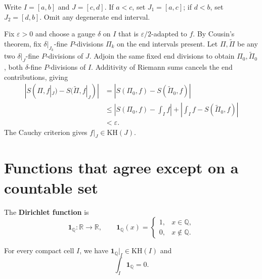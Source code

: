 \begin{proofenv}
Write $I=[a,b]$ and $J=[c,d]$. If $a<c$, set $J_1=[a,c]$;
if $d<b$, set $J_2=[d,b]$. Omit any degenerate end interval.

Fix $\varepsilon>0$ and choose a gauge $\delta$ on $I$ that is
$\varepsilon/2$-adapted to $f$. By Cousin's theorem, fix
$\delta|_{J_k}$-fine $P$-divisions $\Pi_k$ on the end intervals present.
Let $\Pi,\widetilde\Pi$ be any two $\delta|_J$-fine $P$-divisions of $J$.
Adjoin the same fixed end divisions to obtain $\Pi_0,\widetilde\Pi_0$,
both $\delta$-fine $P$-divisions of $I$.
Additivity of Riemann sums cancels the end contributions, giving
\[
\begin{aligned}
    |S(\Pi,f|_J)-S(\widetilde\Pi,f|_J)|
    &=|S(\Pi_0,f)-S(\widetilde\Pi_0,f)|\\
    &\le\left|S(\Pi_0,f)-\int_I f\right|
       +\left|\int_I f-S(\widetilde\Pi_0,f)\right|\\
    &<\varepsilon.
\end{aligned}
\]
The Cauchy criterion gives $f|_J\in\mathrm{KH}(J)$.
\end{proofenv}


\section{Functions that agree except on a countable set}

\begin{definitionenv}
The \textbf{Dirichlet function} is
\[
    \mathbf1_{\mathbb Q}:\mathbb R\to\mathbb R,\qquad
    \mathbf1_{\mathbb Q}(x)=
    \begin{cases}
        1,&x\in\mathbb Q,\\
        0,&x\notin\mathbb Q.
    \end{cases}
\]
\end{definitionenv}

\begin{propositionenv}
For every compact cell $I$, we have
$\mathbf1_{\mathbb Q}|_I\in\mathrm{KH}(I)$ and
\[
    \int_I\mathbf1_{\mathbb Q}=0.
\]
\end{propositionenv}

